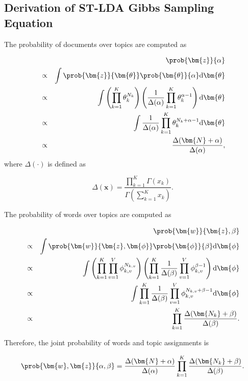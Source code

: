 \begin{appendix}

\section{Derivation of ST-LDA Gibbs Sampling Equation}
\label{sec:derivation}

The probability of documents over topics are computed as

\begin{eqnarray}
&&\prob{\bm{z}}{\alpha} \notag \\
&\propto& \int \prob{\bm{z}}{\bm{\theta}} \prob{\bm{\theta}}{\alpha} \mathrm{d}\bm{\theta}\\
&\propto& \int \left( \prod_{k=1}^{K} \theta_k^{N_k} \right) \left( \frac {1} {\Delta(\alpha)} \prod_{k=1}^{K} \theta_k^{\alpha-1} \right) \mathrm{d}\bm{\theta}\\
&\propto& \int \frac{1}{\Delta(\alpha)} \prod_{k=1}^{K} \theta_k^{N_k+\alpha-1} \mathrm{d}\bm{\theta}\\
&\propto& \frac{\Delta(\bm{N}+\alpha)}{\Delta(\alpha)},
\end{eqnarray}
where $\Delta(\cdot)$ is defined as

\begin{equation}
\Delta(\bm{x}) = \frac {\prod_{k=1}^{K} \Gamma(x_k)} {\Gamma(\sum_{k=1}^{K} x_k)}.
\end{equation}

The probability of words over topics are computed as

\begin{eqnarray}
&&\prob {\bm{w}} {\bm{z}, \beta} \notag \\
&\propto& \int \prob {\bm{w}} {\bm{z}, \bm{\phi}} \prob {\bm{\phi}} {\beta} \mathrm{d} \bm{\phi}\\
&\propto&\int \left( \prod_{k=1}^{K} \prod_{v=1}^{V} \phi_{k,v}^{N_{k,v}} \right) \left( \prod_{k=1}^{K} \frac {1} {\Delta(\beta)} \prod_{v=1}^{V} \phi_{k,v}^{\beta-1} \right) \mathrm{d} \bm{\phi}\\
&\propto&\int \prod_{k=1}^{K} \frac {1} {\Delta(\beta)} \prod_{v=1}^{V} \phi_{k,v}^{N_{k,v}+\beta-1} \mathrm{d} \bm{\phi}\\
&\propto&\prod_{k=1}^{K} \frac {\Delta(\bm{N_k}+\beta)} {\Delta(\beta)}.
\end{eqnarray}

Therefore, the joint probability of words and topic assignments is 

\begin{equation}
\prob {\bm{w}, \bm{z}} {\alpha, \beta} = \frac {\Delta(\bm{N}+\alpha)} {\Delta(\alpha)} \prod_{k=1}^{K} \frac {\Delta(\bm{N_k}+\beta)} {\Delta(\beta)}.
\end{equation}


\end{appendix}
